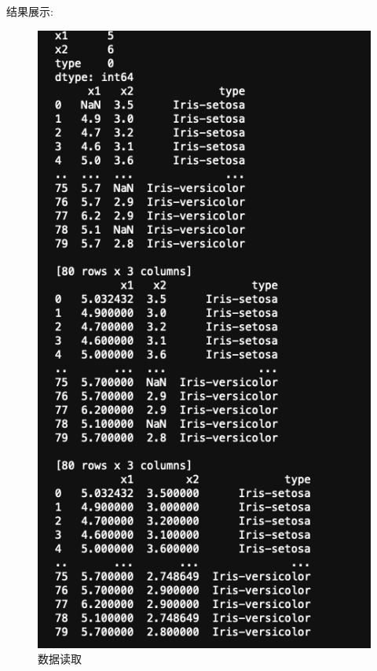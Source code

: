 \documentclass[12pt,a4paper,oneside]{article}
\begin{document}
结果展示:
\begin{figure}[H]
    \centering
    \begin{minipage}{0.4\textwidth}
        \centering
        \includegraphics[width=\textwidth]{image/1} %
        \caption{数据读取}
        \label{fig:image1}
    \end{minipage}
\end{figure}
\end{document}

